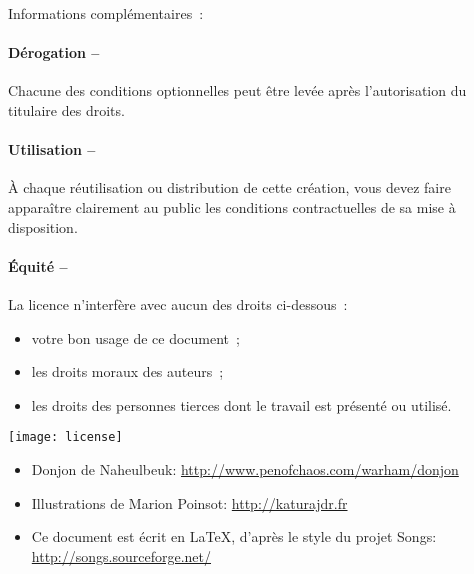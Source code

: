 \begin{lblock}{Informations complémentaires~:}
  
  \hspace{0.4cm}
  \parbox{15cm}{
    \paragraph{Dérogation --} 
    Chacune des conditions optionnelles peut être levée après
    l'autorisation du titulaire des droits.
      
    \paragraph{Utilisation --} 
    À chaque réutilisation ou distribution de cette création, vous
    devez faire apparaître clairement au public les conditions
    contractuelles de sa mise à disposition.

    \paragraph{Équité --} 
    La licence n'interfère avec aucun des droits ci-dessous~:
    \begin{itemize}
    \item votre bon usage de ce document~;
    \item les droits moraux des auteurs~;
    \item les droits des personnes tierces dont le travail est
      présenté ou utilisé.
    \end{itemize}
  }
  
  \begin{center}
    \texttt{[image: license]}
  \end{center}
  
\end{lblock}
\begin{itemize}
\item Donjon de Naheulbeuk:
  \url{http://www.penofchaos.com/warham/donjon}
\item Illustrations de Marion Poinsot: \url{http://katurajdr.fr}
\item Ce document est écrit en \LaTeX, d'après le style du projet
  Songs: \url{http://songs.sourceforge.net/}
\end{itemize}
